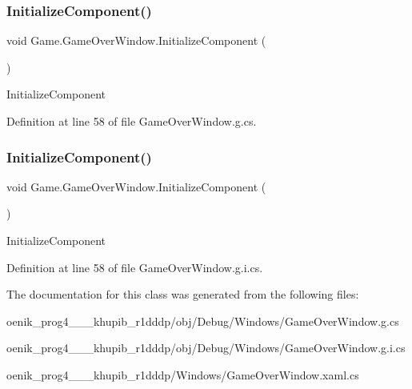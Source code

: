 \subsubsection{\texorpdfstring{InitializeComponent()}{InitializeComponent()}\hspace{0.1cm}{\footnotesize\ttfamily [1/2]}}
{\footnotesize\ttfamily void Game.\+Game\+Over\+Window.\+Initialize\+Component (\begin{DoxyParamCaption}{ }\end{DoxyParamCaption})}



Initialize\+Component 



Definition at line 58 of file Game\+Over\+Window.\+g.\+cs.

\mbox{\label{class_game_1_1_game_over_window_ac79eae24ff9056e4070cab127e910d60}} 
\subsubsection{\texorpdfstring{InitializeComponent()}{InitializeComponent()}\hspace{0.1cm}{\footnotesize\ttfamily [2/2]}}
{\footnotesize\ttfamily void Game.\+Game\+Over\+Window.\+Initialize\+Component (\begin{DoxyParamCaption}{ }\end{DoxyParamCaption})}



Initialize\+Component 



Definition at line 58 of file Game\+Over\+Window.\+g.\+i.\+cs.



The documentation for this class was generated from the following files\+:\begin{DoxyCompactItemize}
\item 
oenik\+\_\+prog4\+\_\+\_\+\_\+khupib\+\_\+r1dddp/obj/\+Debug/\+Windows/Game\+Over\+Window.\+g.\+cs\item 
oenik\+\_\+prog4\+\_\+\_\+\_\+khupib\+\_\+r1dddp/obj/\+Debug/\+Windows/Game\+Over\+Window.\+g.\+i.\+cs\item 
oenik\+\_\+prog4\+\_\+\_\+\_\+khupib\+\_\+r1dddp/\+Windows/Game\+Over\+Window.\+xaml.\+cs\end{DoxyCompactItemize}
